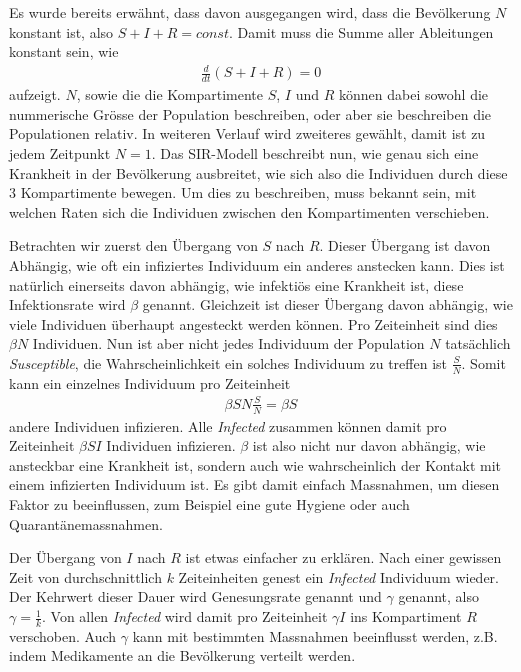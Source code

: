 \begin{refsection}
Es wurde bereits erwähnt, dass davon ausgegangen wird, dass die Bevölkerung $N$ konstant ist, also $S + I + R = const$. Damit muss die Summe aller Ableitungen konstant sein, wie
\begin{align*}
  \frac{d}{dt}\left(S+I+R\right) = 0
\end{align*}
aufzeigt. 
$N$, sowie die die Kompartimente $S$, $I$ und $R$ können dabei sowohl die nummerische Grösse der Population beschreiben, oder aber sie beschreiben die Populationen relativ. 
In weiteren Verlauf wird zweiteres gewählt, damit ist zu jedem Zeitpunkt $N = 1$.
Das SIR-Modell beschreibt nun, wie genau sich eine Krankheit in der Bevölkerung ausbreitet, wie sich also die Individuen durch diese 3 Kompartimente bewegen.
Um dies zu beschreiben, muss bekannt sein, mit welchen Raten sich die Individuen zwischen den Kompartimenten verschieben.

\begin{figure}[H]
  \centering
  
\end{figure}

Betrachten wir zuerst den Übergang von $S$ nach $R$.
Dieser Übergang ist davon Abhängig, wie oft ein infiziertes Individuum ein anderes anstecken kann.
Dies ist natürlich einerseits davon abhängig, wie infektiös eine Krankheit ist, diese Infektionsrate wird $\beta$ genannt.
Gleichzeit ist dieser Übergang davon abhängig, wie viele Individuen überhaupt angesteckt werden können. 
Pro Zeiteinheit sind dies $\beta N$ Individuen.
Nun ist aber nicht jedes Individuum der Population $N$ tatsächlich \emph{Susceptible}, die Wahrscheinlichkeit ein solches Individuum zu treffen ist $\frac{S}{N}$.
Somit kann ein einzelnes Individuum pro Zeiteinheit 
\begin{align*}
  \beta S N \frac{S}{N} = \beta S
\end{align*}
andere Individuen infizieren.
Alle \emph{Infected} zusammen können damit pro Zeiteinheit $\beta S I$ Individuen infizieren. 
$\beta$ ist also nicht nur davon abhängig, wie ansteckbar eine Krankheit ist, sondern auch wie wahrscheinlich der Kontakt mit einem infizierten Individuum ist. 
Es gibt damit einfach Massnahmen, um diesen Faktor zu beeinflussen, zum Beispiel eine gute Hygiene oder auch Quarantänemassnahmen.

Der Übergang von $I$ nach $R$ ist etwas einfacher zu erklären. 
Nach einer gewissen Zeit von durchschnittlich $k$ Zeiteinheiten genest ein \emph{Infected} Individuum wieder.
Der Kehrwert dieser Dauer wird Genesungsrate genannt und $\gamma$ genannt, also $\gamma = \frac{1}{k}$.
Von allen \emph{Infected} wird damit pro Zeiteinheit $\gamma I$ ins Kompartiment $R$ verschoben.
Auch $\gamma$ kann mit bestimmten Massnahmen beeinflusst werden, z.B. indem Medikamente an die Bevölkerung verteilt werden.


\end{refsection}

